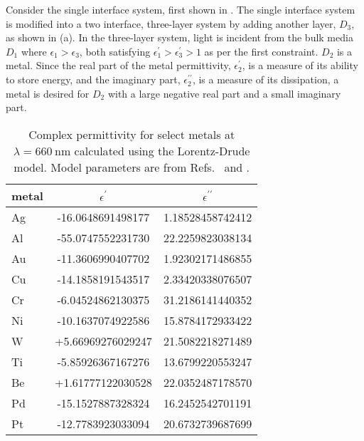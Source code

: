 Consider the single interface system, first shown in
.  The single interface system is modified
into a two interface, three-layer system by adding another layer, $D_3$, as
shown in (a).  In the three-layer system,
light is incident from the bulk media $D_1$ where $\epsilon_1>\epsilon_3$,
both satisfying $\epsilon^\prime_1>\epsilon^\prime_3>1$ as per the first
constraint.  $D_2$ is a metal.  Since the real part of the metal
permittivity, $\epsilon_2^\prime$, is a measure of its ability to store
energy, and the imaginary part, $\epsilon_2^{\prime\prime}$, is a measure of
its dissipation, a metal is desired for $D_2$ with a large negative real
part and a small imaginary part.
\begin{table}[ht]
  \centering
  \begin{tabular}{lSS}
    \toprule
    metal & {$\epsilon^\prime$} & {$\epsilon^{\prime\prime}$} \\
    \midrule
    Ag    & -16.0648691498177   & 1.18528458742412            \\
    Al    & -55.0747552231730   & 22.2259823038134            \\
    Au    & -11.3606990407702   & 1.92302171486855            \\
    Cu    & -14.1858191543517   & 2.33420338076507            \\
    Cr    & -6.04524862130375   & 31.2186141440352            \\
    Ni    & -10.1637074922586   & 15.8784172933422            \\
    W     & +5.66969276029247   & 21.5082218271489            \\
    Ti    & -5.85926367167276   & 13.6799220553247            \\
    Be    & +1.61777122030528   & 22.0352487178570            \\
    Pd    & -15.1527887328324   & 16.2452542701191            \\
    Pt    & -12.7783923033094   & 20.6732739687699            \\
    \bottomrule
  \end{tabular}
  \caption{Complex permittivity for select metals at
    $\lambda=\SI{660}{\nano\meter}$ calculated using the Lorentz-Drude
    model.  Model parameters are from Refs.~\cite{ung2007interference} and
    \cite{rakic1998optical}.}
  \label{tbl:epsmetal600}
\end{table}

